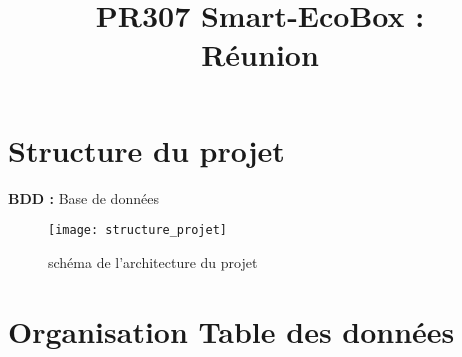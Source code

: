\documentclass[10pt,a4paper]{article}
\title{PR307 Smart-EcoBox : \\ Réunion}
\begin{document}
\maketitle

\section {Structure du projet}
\textbf{BDD :} Base de données

\begin{figure}[h]
\centering
\texttt{[image: structure\_projet]}
\caption{schéma de l'architecture du projet}
\label{fig:my_label}
\end{figure}

\section{Organisation Table des données}
\end{document}
